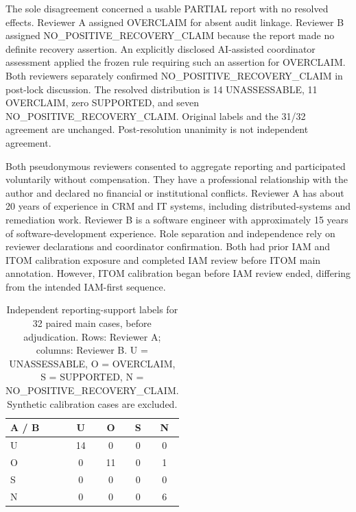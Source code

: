 \documentclass[conference,10pt]{IEEEtran}
\begin{document}
The sole disagreement concerned a usable PARTIAL report with no resolved effects. Reviewer A assigned OVERCLAIM for absent audit linkage. Reviewer B assigned NO\_\allowbreak{}POSITIVE\_\allowbreak{}RECOVERY\_\allowbreak{}CLAIM because the report made no definite recovery assertion. An explicitly disclosed AI-assisted coordinator assessment applied the frozen rule requiring such an assertion for OVERCLAIM. Both reviewers separately confirmed NO\_\allowbreak{}POSITIVE\_\allowbreak{}RECOVERY\_\allowbreak{}CLAIM in post-lock discussion. The resolved distribution is 14 UNASSESSABLE, 11 OVERCLAIM, zero SUPPORTED, and seven NO\_\allowbreak{}POSITIVE\_\allowbreak{}RECOVERY\_\allowbreak{}CLAIM. Original labels and the 31/32 agreement are unchanged. Post-resolution unanimity is not independent agreement.

Both pseudonymous reviewers consented to aggregate reporting and participated voluntarily without compensation. They have a professional relationship with the author and declared no financial or institutional conflicts. Reviewer A has about 20 years of experience in CRM and IT systems, including distributed-systems and remediation work. Reviewer B is a software engineer with approximately 15 years of software-development experience. Role separation and independence rely on reviewer declarations and coordinator confirmation. Both had prior IAM and ITOM calibration exposure and completed IAM review before ITOM main annotation. However, ITOM calibration began before IAM review ended, differing from the intended IAM-first sequence.

\begin{table}[!t]

\caption{Independent reporting-support labels for 32 paired main cases, before adjudication. Rows: Reviewer A; columns: Reviewer B. U = UNASSESSABLE, O = OVERCLAIM, S = SUPPORTED, N = NO\_\allowbreak{}POSITIVE\_\allowbreak{}RECOVERY\_\allowbreak{}CLAIM. Synthetic calibration cases are excluded.}

\label{tab:5}

\centering\footnotesize

\setlength{\tabcolsep}{3pt}

\renewcommand{\arraystretch}{1.12}

\begin{tabular}{@{}lcccc@{}}

\toprule

A / B & U & O & S & N \\

\midrule

U & 14 & 0 & 0 & 0 \\

O & 0 & 11 & 0 & 1 \\

S & 0 & 0 & 0 & 0 \\

N & 0 & 0 & 0 & 6 \\

\bottomrule

\end{tabular}

\end{table}
\end{document}
